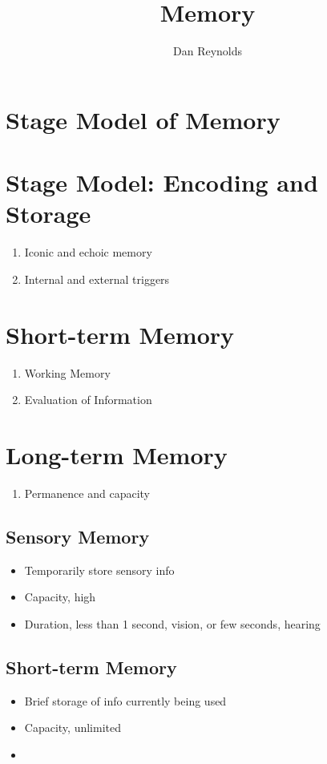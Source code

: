 \documentclass[12pt]{article}
\title{Memory}
\author{Dan Reynolds}
\begin{document}
\maketitle
\section*{Stage Model of Memory}
\section*{Stage Model: Encoding and Storage}
\begin{enumerate}
  \item Iconic and echoic memory 
  \item Internal and external triggers
\end{enumerate}
\section*{Short-term Memory}
\begin{enumerate}
  \item Working Memory
  \item Evaluation of Information
\end{enumerate}
\section*{Long-term Memory}
\begin{enumerate}
  \item Permanence and capacity
\end{enumerate}
\subsection*{Sensory Memory}
\begin{itemize}
  \item Temporarily store sensory info
  \item Capacity, high
  \item Duration, less than 1 second, vision, or few seconds, hearing
\end{itemize}
\subsection*{Short-term Memory}
\begin{itemize}
  \item Brief storage of info currently being used
  \item Capacity, unlimited
  \item 
\end{itemize}
\end{document}
